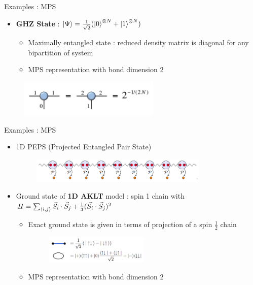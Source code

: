 \documentclass{beamer}
\begin{document}
\begin{frame}{Examples : MPS}
\begin{itemize}
	\item \textbf{GHZ State} : ${ \ket{\Psi }=\frac{1}{\sqrt{2}}(\ket{0}^{\otimes N}+\ket{1}^{\otimes N}) }$
		\begin{itemize}
		\item Maximally entangled state : reduced density matrix is diagonal for any bipartition of system
		\item MPS representation with bond dimension 2
		\end{itemize}
	\end{itemize}
	\begin{figure}[h]
	\includegraphics[width=0.6\textwidth]{ghz}
	\centering
	\end{figure}
	
\end{frame}

\begin{frame}{Examples : MPS}
	\begin{itemize}
		\item 1D PEPS (Projected Entangled Pair State)
			\begin{figure}[h]
			\includegraphics[width=0.8\textwidth]{peps1d}
			\centering
			\end{figure}
			
	\item Ground state of \textbf{1D AKLT} model : spin 1 chain with ${ H=\sum_{\ev{i,j}}^{} \vec{S}_{i}\cdot \vec{S}_{j}+ \frac{1}{3}(\vec{S}_{i}\cdot \vec{S}_{j})^{2} }$
		\begin{itemize}
		\item Exact ground state is given in terms of projection of a spin ${ \frac{1}{2} }$ chain
			\begin{figure}[h]
			\includegraphics[width=0.5\textwidth]{aklt}
			\centering
			\end{figure}
			
		\item MPS representation with bond dimension 2
		\end{itemize}
	\end{itemize}
\end{frame}
\end{document}
